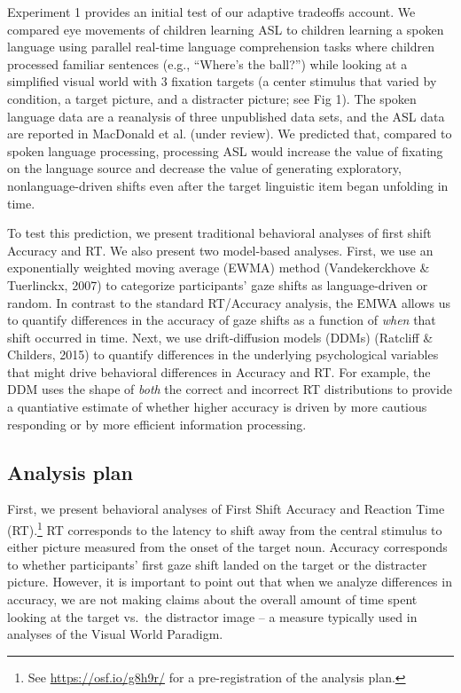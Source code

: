 \documentclass[english,man]{apa6}
\theoremstyle{definition}
\theoremstyle{definition}
\theoremstyle{definition}
\theoremstyle{remark}
\begin{document}
Experiment 1 provides an initial test of our adaptive tradeoffs account.
We compared eye movements of children learning ASL to children learning
a spoken language using parallel real-time language comprehension tasks
where children processed familiar sentences (e.g., \enquote{Where's the
ball?}) while looking at a simplified visual world with 3 fixation
targets (a center stimulus that varied by condition, a target picture,
and a distracter picture; see Fig 1). The spoken language data are a
reanalysis of three unpublished data sets, and the ASL data are reported
in MacDonald et al. (under review). We predicted that, compared to
spoken language processing, processing ASL would increase the value of
fixating on the language source and decrease the value of generating
exploratory, nonlanguage-driven shifts even after the target linguistic
item began unfolding in time.

To test this prediction, we present traditional behavioral analyses of
first shift Accuracy and RT. We also present two model-based analyses.
First, we use an exponentially weighted moving average (EWMA) method
(Vandekerckhove \& Tuerlinckx, 2007) to categorize participants' gaze
shifts as language-driven or random. In contrast to the standard
RT/Accuracy analysis, the EMWA allows us to quantify differences in the
accuracy of gaze shifts as a function of \emph{when} that shift occurred
in time. Next, we use drift-diffusion models (DDMs) (Ratcliff \&
Childers, 2015) to quantify differences in the underlying psychological
variables that might drive behavioral differences in Accuracy and RT.
For example, the DDM uses the shape of \emph{both} the correct and
incorrect RT distributions to provide a quantiative estimate of whether
higher accuracy is driven by more cautious responding or by more
efficient information processing.

\hypertarget{analysis-plan}{%
\subsection{Analysis plan}\label{analysis-plan}}

First, we present behavioral analyses of First Shift Accuracy and
Reaction Time (RT).\footnote{See \url{https://osf.io/g8h9r/} for a
  pre-registration of the analysis plan.} RT corresponds to the latency
to shift away from the central stimulus to either picture measured from
the onset of the target noun. Accuracy corresponds to whether
participants' first gaze shift landed on the target or the distracter
picture. However, it is important to point out that when we analyze
differences in accuracy, we are not making claims about the overall
amount of time spent looking at the target vs.~the distractor image -- a
measure typically used in analyses of the Visual World Paradigm.
\end{document}
